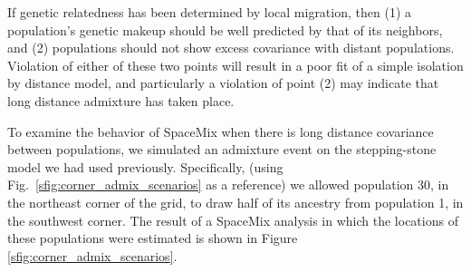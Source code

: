 \documentclass[12pt]{article}
\newcommand{\plr}[1]{{\it\color{green}{(#1)}}}
\begin{document}

If genetic relatedness has been determined by local migration, 
\plr{changed from ``well-fit by a model of IBD'' since that is more vague}
then (1) a population's genetic makeup should be well predicted by that of its neighbors, and (2) populations should not show excess covariance with distant populations. Violation of either of these two points will result in a poor fit of a simple isolation by distance model, and particularly a violation of point (2) may indicate that long distance admixture has taken place.

To examine the behavior of SpaceMix when there is long distance covariance between populations, we simulated an admixture event on the stepping-stone model we had used previously.  Specifically, (using Fig.\ \ref{sfig:corner_admix_scenarios} as a reference) we allowed population 30, in the northeast corner of the grid, to draw half of its ancestry from population 1, in the southwest corner.  The result of a SpaceMix analysis in which the locations of these populations were estimated is shown in Figure \ref{sfig:corner_admix_scenarios}.
\end{document}
